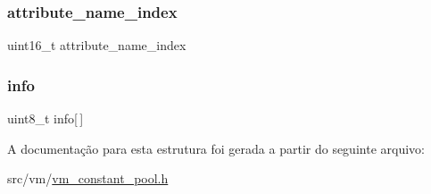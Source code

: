 \subsubsection{\texorpdfstring{attribute\+\_\+name\+\_\+index}{attribute\_name\_index}}
{\footnotesize\ttfamily uint16\+\_\+t attribute\+\_\+name\+\_\+index}

\mbox{\label{structvm__attribute__info__t_ae7298a15945258c127fdc64b7556459c}} 
\subsubsection{\texorpdfstring{info}{info}}
{\footnotesize\ttfamily uint8\+\_\+t info\mbox{[}$\,$\mbox{]}}



A documentação para esta estrutura foi gerada a partir do seguinte arquivo\+:\begin{DoxyCompactItemize}
\item 
src/vm/\hyperlink{vm__constant__pool_8h}{vm\+\_\+constant\+\_\+pool.\+h}\end{DoxyCompactItemize}
